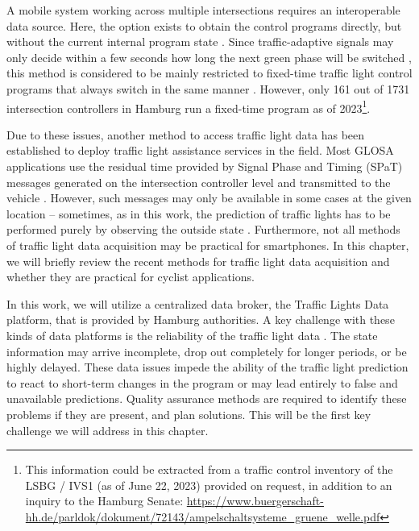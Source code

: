 A mobile system working across multiple intersections requires an interoperable data source. Here, the option exists to obtain the control programs directly, but without the current internal program state \cite{zweck_traffic_2013}. Since traffic-adaptive signals may only decide within a few seconds how long the next green phase will be switched \cite{islam_improved_2016}, this method is considered to be mainly restricted to fixed-time traffic light control programs that always switch in the same manner \cite{zweck_traffic_2013}. However, only 161 out of 1731 intersection controllers in Hamburg run a fixed-time program as of 2023\footnote{This information could be extracted from a traffic control inventory of the LSBG / IVS1 (as of June 22, 2023) provided on request, in addition to an inquiry to the Hamburg Senate: \url{https://www.buergerschaft-hh.de/parldok/dokument/72143/ampelschaltsysteme_gruene_welle.pdf}}.

Due to these issues, another method to access traffic light data has been established to deploy traffic light assistance services in the field. Most GLOSA applications use the residual time provided by Signal Phase and Timing (SPaT) messages generated on the intersection controller level and transmitted to the vehicle \cite{wagner_spatmap_2023}. However, such messages may only be available in some cases at the given location -- sometimes, as in this work, the prediction of traffic lights has to be performed purely by observing the outside state \cite{protschky_extensive_2014, protschky_adaptive_2014}. Furthermore, not all methods of traffic light data acquisition may be practical for smartphones. In this chapter, we will briefly review the recent methods for traffic light data acquisition and whether they are practical for cyclist applications.

In this work, we will utilize a centralized data broker, the Traffic Lights Data platform, that is provided by Hamburg authorities. A key challenge with these kinds of data platforms is the reliability of the traffic light data \cite{protschky_extensive_2014, protschky_adaptive_2014}. The state information may arrive incomplete, drop out completely for longer periods, or be highly delayed. These data issues impede the ability of the traffic light prediction to react to short-term changes in the program or may lead entirely to false and unavailable predictions. Quality assurance methods are required to identify these problems if they are present, and plan solutions. This will be the first key challenge we will address in this chapter.

